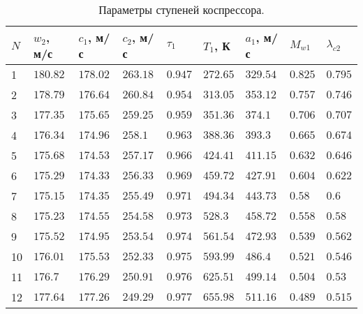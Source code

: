 \documentclass[a4paper,10pt]{article}
\begin{document}
    \begin{longtable}{|p{0.7cm}|p{1.1cm}|p{1.1cm}|p{1.1cm}|p{1.1cm}|p{1.1cm}| p{1.1cm}|p{1.1cm}|p{1.1cm}|}
        \caption{Параметры ступеней коспрессора.}\\ \hline
        $N$ & $w_2$, м/с & $c_1$, м/с & $c_2$, м/с & $\tau_1$ & $T_1$, К & $a_1$, м/с & $M_{w1}$ & $\lambda_{c2}$ \\ \hline
%        
        1 & $180.82$ &
        $178.02$ & $263.18$ & $0.947$ &
        $272.65$ & $329.54$ & $0.825$ &
        $0.795$\\ \hline
%        
        2 & $178.79$ &
        $176.64$ & $260.84$ & $0.954$ &
        $313.05$ & $353.12$ & $0.757$ &
        $0.746$\\ \hline
%        
        3 & $177.35$ &
        $175.65$ & $259.25$ & $0.959$ &
        $351.36$ & $374.1$ & $0.706$ &
        $0.707$\\ \hline
%        
        4 & $176.34$ &
        $174.96$ & $258.1$ & $0.963$ &
        $388.36$ & $393.3$ & $0.665$ &
        $0.674$\\ \hline
%        
        5 & $175.68$ &
        $174.53$ & $257.17$ & $0.966$ &
        $424.41$ & $411.15$ & $0.632$ &
        $0.646$\\ \hline
%        
        6 & $175.29$ &
        $174.33$ & $256.33$ & $0.969$ &
        $459.72$ & $427.91$ & $0.604$ &
        $0.622$\\ \hline
%        
        7 & $175.15$ &
        $174.35$ & $255.49$ & $0.971$ &
        $494.34$ & $443.73$ & $0.58$ &
        $0.6$\\ \hline
%        
        8 & $175.23$ &
        $174.55$ & $254.58$ & $0.973$ &
        $528.3$ & $458.72$ & $0.558$ &
        $0.58$\\ \hline
%        
        9 & $175.52$ &
        $174.95$ & $253.54$ & $0.974$ &
        $561.54$ & $472.93$ & $0.539$ &
        $0.562$\\ \hline
%        
        10 & $176.01$ &
        $175.53$ & $252.33$ & $0.975$ &
        $593.99$ & $486.4$ & $0.521$ &
        $0.546$\\ \hline
%        
        11 & $176.7$ &
        $176.29$ & $250.91$ & $0.976$ &
        $625.51$ & $499.14$ & $0.504$ &
        $0.53$\\ \hline
%        
        12 & $177.64$ &
        $177.26$ & $249.29$ & $0.977$ &
        $655.98$ & $511.16$ & $0.489$ &
        $0.515$\\ \hline
%        
    \end{longtable}

    
\end{document}
